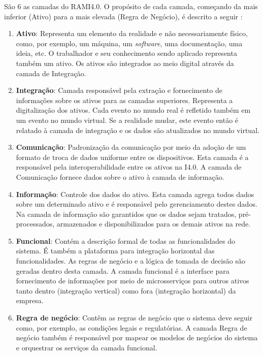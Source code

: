 	São 6 as camadas do RAMI4.0. O propósito de cada camada, começando da mais inferior (Ativo) para a mais elevada (Regra de Negócio), é descrito a seguir \cite{bitkom2016implementation}:
	
	\begin{enumerate}
		\item \textbf{Ativo}: Representa um elemento da realidade e não necessariamente físico, como, por exemplo, um máquina, um \textit{software}, uma documentação, uma ideia, etc. O trabalhador e seu conhecimento sendo aplicado representa também um ativo. Os ativos são integrados ao meio digital através da camada de Integração.
		
		\item \textbf{Integração}: Camada responsável pela extração e fornecimento de informações sobre os ativos para as camadas superiores. Representa a digitalização dos ativos. Cada evento no mundo real é refletido também em um evento no mundo virtual. Se a realidade mudar, este evento então é relatado à camada de integração e os dados são atualizados no mundo virtual.
		
		\item \textbf{Comunicação}: Padronização da comunicação por meio da adoção de um formato de troca de dados uniforme entre os dispositivos. Esta camada é a responsável pela interoperabilidade entre os ativos na I4.0. A camada de Comunicação fornece dados sobre o ativo à camada de informação.
		
		\item \textbf{Informação}: Controle dos dados do ativo. Esta camada agrega todos dados sobre um determinado ativo e é responsável pelo gerenciamento destes dados. Na camada de informação são garantidos que os dados sejam tratados, pré-processados, armazenados e disponibilizados para os demais ativos na rede.
		
		\item \textbf{Funcional}: Contém a descrição formal de todas as funcionalidades do sistema. É também a plataforma para integração horizontal das funcionalidades. As regras de negócio e a lógica de tomada de decisão são geradas dentro desta camada. A camada funcional é a interface para fornecimento de informações por meio de microsserviços para outros ativos tanto dentro (integração vertical) como fora (integração horizontal) da empresa.
			
		\item \textbf{Regra de negócio}: Contêm as regras de negócio que o sistema deve seguir como, por exemplo, as condições legais e regulatórias. A camada Regra de negócio também é responsável por mapear os modelos de negócios do sistema e orquestrar os serviços da camada funcional.

		
	\end{enumerate}

